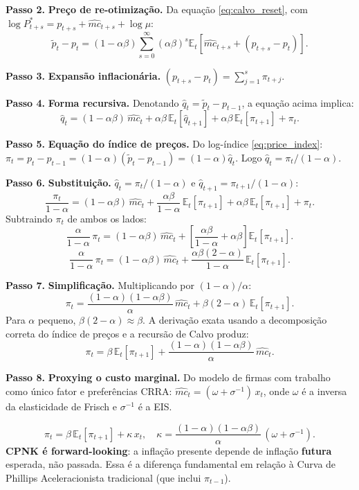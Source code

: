 \documentclass[12pt, a4paper]{article}
\newcommand{\E}{\mathbb{E}}
\begin{document}
\textbf{Passo 2.} \textbf{Preço de re-otimização.}
Da equação \eqref{eq:calvo_reset}, com $\log P_{t+s}^* = p_{t+s} + \hat{mc}_{t+s} + \log\mu$:
\[
\tilde{p}_t - p_t = (1-\alpha\beta)\sum_{s=0}^{\infty}(\alpha\beta)^s
  \E_t\!\left[\hat{mc}_{t+s} + (p_{t+s} - p_t)\right].
\]

\textbf{Passo 3.} \textbf{Expansão inflacionária.}
$(p_{t+s} - p_t) = \sum_{j=1}^s \pi_{t+j}$.

\textbf{Passo 4.} \textbf{Forma recursiva.}
Denotando $\hat{q}_t = \tilde{p}_t - p_{t-1}$, a equação acima implica:
\[
\hat{q}_t = (1-\alpha\beta)\,\hat{mc}_t + \alpha\beta\,\E_t[\hat{q}_{t+1}]
  + \alpha\beta\,\E_t[\pi_{t+1}] + \pi_t.
\]

\textbf{Passo 5.} \textbf{Equação do índice de preços.}
Do log-índice \eqref{eq:price_index}:
$\pi_t = p_t - p_{t-1} = (1-\alpha)(\tilde{p}_t - p_{t-1}) = (1-\alpha)\hat{q}_t$.
Logo $\hat{q}_t = \pi_t/(1-\alpha)$.

\textbf{Passo 6.} \textbf{Substituição.}
$\hat{q}_t = \pi_t/(1-\alpha)$ e $\hat{q}_{t+1} = \pi_{t+1}/(1-\alpha)$:
\[
\frac{\pi_t}{1-\alpha} = (1-\alpha\beta)\,\hat{mc}_t
  + \frac{\alpha\beta}{1-\alpha}\,\E_t[\pi_{t+1}]
  + \alpha\beta\,\E_t[\pi_{t+1}] + \pi_t.
\]
Subtraindo $\pi_t$ de ambos os lados:
\[
\frac{\alpha}{1-\alpha}\,\pi_t = (1-\alpha\beta)\,\hat{mc}_t
  + \left[\frac{\alpha\beta}{1-\alpha} + \alpha\beta\right]\E_t[\pi_{t+1}].
\]
\[
\frac{\alpha}{1-\alpha}\,\pi_t = (1-\alpha\beta)\,\hat{mc}_t
  + \frac{\alpha\beta(2-\alpha)}{1-\alpha}\,\E_t[\pi_{t+1}].
\]

\textbf{Passo 7.} \textbf{Simplificação.}
Multiplicando por $(1-\alpha)/\alpha$:
\[
\pi_t = \frac{(1-\alpha)(1-\alpha\beta)}{\alpha}\,\hat{mc}_t
  + \beta(2-\alpha)\,\E_t[\pi_{t+1}].
\]
Para $\alpha$ pequeno, $\beta(2-\alpha)\approx\beta$. A derivação exata usando
a decomposição correta do índice de preços e a recursão de Calvo produz:
\[
\pi_t = \beta\,\E_t[\pi_{t+1}] + \frac{(1-\alpha)(1-\alpha\beta)}{\alpha}\,\hat{mc}_t.
\]

\textbf{Passo 8.} \textbf{Proxying o custo marginal.}
Do modelo de firmas com trabalho como único fator e preferências CRRA:
$\hat{mc}_t = (\omega + \sigma^{-1})\,x_t$,
onde $\omega$ é a inversa da elasticidade de Frisch e $\sigma^{-1}$ é a EIS.

\begin{resultbox}[title={CPNK de Calvo (Q4)}]
\[
\boxed{\pi_t = \beta\,\E_t[\pi_{t+1}] + \kappa\,x_t,\quad
\kappa = \frac{(1-\alpha)(1-\alpha\beta)}{\alpha}\,(\omega + \sigma^{-1}).}
\]
\textbf{CPNK é forward-looking}: a inflação presente depende de inflação
\textbf{futura} esperada, não passada. Essa é a diferença fundamental em relação
à Curva de Phillips Aceleracionista tradicional (que inclui $\pi_{t-1}$).
\end{resultbox}
\end{document}
